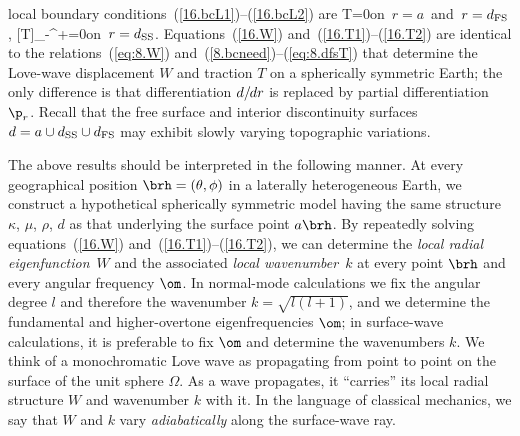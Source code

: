 local boundary conditions~(\ref{16.bcL1})--(\ref{16.bcL2}) are
\eq \label{16.T1}
T=0\quad\mbox{on $r=a$ and $r=d_{\rm FS}$},
\en
\eq \label{16.T2}
[T]_-^+=0\quad\mbox{on $r=d_{\rm SS}$}.
\en
Equations~(\ref{16.W}) and~(\ref{16.T1})--(\ref{16.T2}) are identical to the
relations~(\ref{eq:8.W}) and~(\ref{8.bcneed})--(\ref{eq:8.dfsT})
that determine the Love-wave displacement $W$ and traction $T$
on a spherically symmetric Earth; the only difference is that
differentiation $d/\hspace{-0.3 mm}dr$ is replaced by partial
differentiation $\p_r$.  Recall that the free surface and interior
discontinuity surfaces
$d=a\cup d_{\rm SS}\cup d_{\rm FS}$ may exhibit slowly varying
topographic variations.

The above results should be interpreted in the following manner.
At every geographical position $\brh=(\theta,\phi)$ in a laterally
heterogeneous Earth, we construct a hypothetical spherically
symmetric model having the same structure $\kappa$,
$\mu$, $\rho$, $d$ as that underlying the surface point $a\brh$.
By repeatedly solving equations~(\ref{16.W})
and~(\ref{16.T1})--(\ref{16.T2}), we can determine
the {\em local radial eigenfunction\/}~$W$ and the associated
%
%
%
%
{\em local wavenumber\/}~$k$ at every point $\brh$
and every angular frequency $\om$.  In normal-mode calculations
we fix the angular degree $l$ and therefore the wavenumber
$k=\sqrt{l(l+1)}$, and we determine the fundamental and
higher-overtone eigenfrequencies $\om$; in surface-wave
calculations, it is preferable to fix $\om$ and determine
the wavenumbers $k$.  We think of a monochromatic Love
wave as propagating from point to point on the surface of
the unit sphere $\Omega$.
As a wave propagates, it ``carries'' its local radial structure
$W$ and wavenumber $k$ with it.  In the language of classical
mechanics, we say that $W$ and $k$ vary {\em adiabatically\/}
%
along the surface-wave ray.

